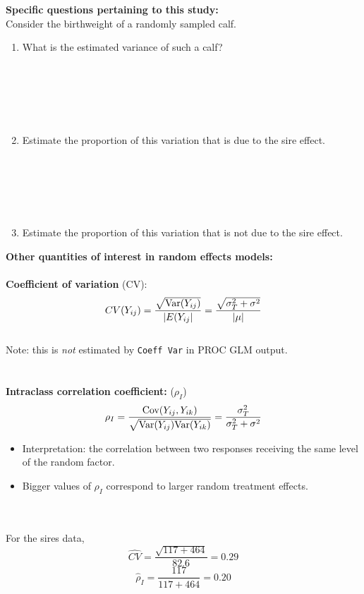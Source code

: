 \textbf{Specific questions pertaining to this study:}\\
Consider the birthweight of a randomly sampled calf.
\begin{enumerate}
\item What is the estimated variance of such a calf?\\~\\~\\~\\~\\~\\
\item Estimate the proportion of this variation that is due to the sire effect.\\~\\~\\~\\~\\~\\
\item Estimate the proportion of this variation that is not due to the sire effect.
\end{enumerate}

\newpage

\textbf{Other quantities of interest in random effects models:}\\~\\
\textbf{Coefficient of variation} (CV): 
$$ CV(Y_{ij}) = \frac{\sqrt{\mbox{Var}(Y_{ij})}}{|E(Y_{ij}|} = \frac{\sqrt{\sigma_T^2 + \sigma^2}}{|\mu|}$$~\\
Note: this is {\em not} estimated by {\tt Coeff Var} in PROC GLM output.\\~\\~\\

\textbf{Intraclass correlation coefficient:} ($\rho_I$)
$$ \rho_I = \frac{\mbox{Cov}(Y_{ij},Y_{ik})}{\sqrt{\mbox{Var}(Y_{ij})\mbox{Var}(Y_{ik})}}= \frac{\sigma_T^2}{\sigma_T^2 + \sigma^2}$$

\begin{itemize}
\item Interpretation: the correlation between two responses receiving the same level of the random factor.
\item Bigger values of $\rho_I$ correspond to larger random treatment effects.
\end{itemize}
~\\~\\
For the sires data,
$$\widehat{CV}  =  \frac{\sqrt{117 + 464}}{82.6} = 0.29 $$
$$\hat\rho_I = \frac{117}{117+464} = 0.20$$ 

